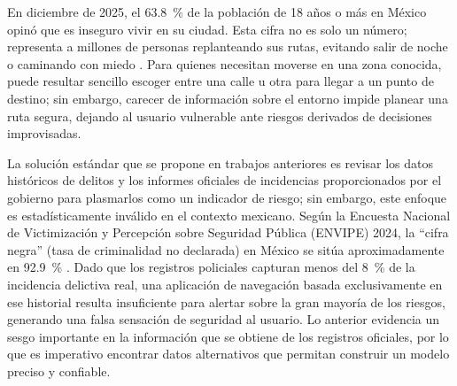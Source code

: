 
En diciembre de 2025, el 63.8~\% de la población de 18 años o más en México opinó que es inseguro vivir en su ciudad. Esta cifra no es solo un número; representa a millones de personas replanteando sus rutas, evitando salir de noche o caminando con miedo \cite{ENSUdic2025}. Para quienes necesitan moverse en una zona conocida, puede resultar sencillo escoger entre una calle u otra para llegar a un punto de destino; sin embargo, carecer de información sobre el entorno impide planear una ruta segura, dejando al usuario vulnerable ante riesgos derivados de decisiones improvisadas.

La solución estándar que se propone en trabajos anteriores es revisar los datos históricos de delitos y los informes oficiales de incidencias proporcionados por el gobierno para plasmarlos como un indicador de riesgo; sin embargo, este enfoque es estadísticamente inválido en el contexto mexicano. Según la Encuesta Nacional de Victimización y Percepción sobre Seguridad Pública (ENVIPE) 2024, la \enquote{cifra negra} (tasa de criminalidad no declarada) en México se sitúa aproximadamente en 92.9~\% \cite{ENVIPE2024}. Dado que los registros policiales capturan menos del 8~\% de la incidencia delictiva real, una aplicación de navegación basada exclusivamente en ese historial resulta insuficiente para alertar sobre la gran mayoría de los riesgos, generando una falsa sensación de seguridad al usuario. Lo anterior evidencia un sesgo importante en la información que se obtiene de los registros oficiales, por lo que es imperativo encontrar datos alternativos que permitan construir un modelo preciso y confiable.
